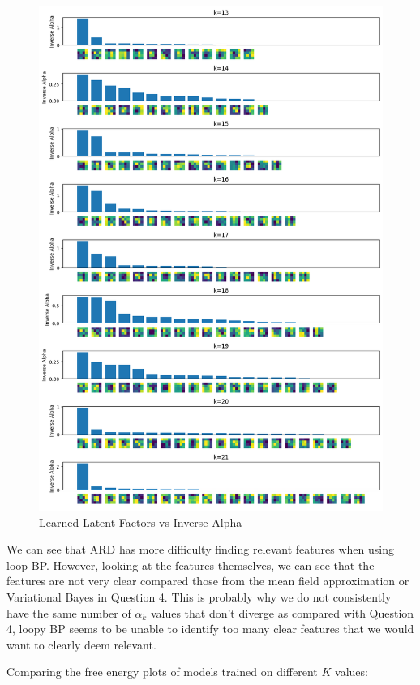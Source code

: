 \documentclass[12pt]{article}
\begin{document}
\newpage
\begin{figure}[h]
\centering
\includegraphics[scale=0.47]{outputs/q5/d-2-latent-factors-comparison}
\caption{Learned Latent Factors vs Inverse Alpha}
\label{fig:}
\end{figure}

We can see that ARD has more difficulty finding relevant features when using loop BP.
However, looking at the features themselves, we can see that the features are not very clear compared those from the mean field approximation or Variational Bayes in Question 4.
This is probably why we do not consistently have the same number of $\alpha_k$ values that don't diverge as compared with Question 4, loopy BP seems to be unable to identify too many clear features that we would want to clearly deem relevant.

\newpage
Comparing the free energy plots of models trained on different $K$ values:
\end{document}
